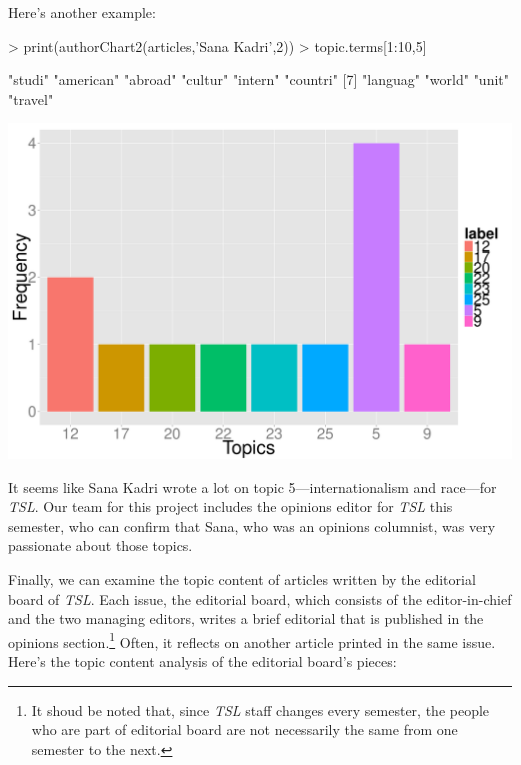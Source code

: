 \documentclass[a4paper]{article}
\begin{document}
Here's another example:

\begin{Schunk}
\begin{Sinput}
> print(authorChart2(articles,'Sana Kadri',2))
> topic.terms[1:10,5]
\end{Sinput}
\begin{Soutput}
 [1] "studi"    "american" "abroad"   "cultur"   "intern"   "countri" 
 [7] "languag"  "world"    "unit"     "travel"  
\end{Soutput}
\end{Schunk}
\includegraphics{FinalProject-011}

It seems like Sana Kadri wrote a lot on topic 5---internationalism and race---for \textit{TSL}. Our team for this project includes the opinions editor for \textit{TSL} this semester, who can confirm that Sana, who was an opinions columnist, was very passionate about those topics.

Finally, we can examine the topic content of articles written by the editorial board of \textit{TSL}. Each issue, the editorial board, which consists of the editor-in-chief and the two managing editors, writes a brief editorial that is published in the opinions section.\footnote{It shoud be noted that, since \textit{TSL} staff changes every semester, the people who are part of editorial board are not necessarily the same from one semester to the next.} Often, it reflects on another article printed in the same issue. Here's the topic content analysis of the editorial board's pieces:
\end{document}
